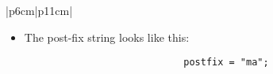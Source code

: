 \begin{center}
\begin{longtable}{ |p{6cm}|p{11cm}| }
\begin{itemize}
                \item The post-fix string looks like this: 
                    {
                        \begin{verbatim}
                            postfix = "ma";
                        \end{verbatim}
                    }
            \end{itemize}
            \\
        
        \hline
        \hline
             \\
        

\end{longtable}
\end{center}
